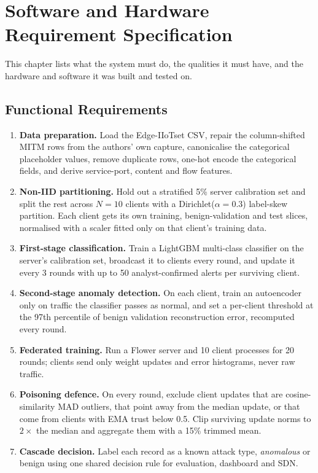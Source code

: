 \chapter{Software and Hardware Requirement Specification}
This chapter lists what the system must do, the qualities it must have, and the hardware and software it was built and tested on.

\section{Functional Requirements}
\begin{enumerate}
  \item[FR1] \textbf{Data preparation.} Load the Edge-IIoTset CSV, repair the column-shifted MITM rows from the authors' own capture, canonicalise the categorical placeholder values, remove duplicate rows, one-hot encode the categorical fields, and derive service-port, content and flow features.
  \item[FR2] \textbf{Non-IID partitioning.} Hold out a stratified 5\% server calibration set and split the rest across $N=10$ clients with a Dirichlet($\alpha=0.3$) label-skew partition. Each client gets its own training, benign-validation and test slices, normalised with a scaler fitted only on that client's training data.
  \item[FR3] \textbf{First-stage classification.} Train a LightGBM multi-class classifier on the server's calibration set, broadcast it to clients every round, and update it every 3 rounds with up to 50 analyst-confirmed alerts per surviving client.
  \item[FR4] \textbf{Second-stage anomaly detection.} On each client, train an autoencoder only on traffic the classifier passes as normal, and set a per-client threshold at the 97th percentile of benign validation reconstruction error, recomputed every round.
  \item[FR5] \textbf{Federated training.} Run a Flower server and 10 client processes for 20 rounds; clients send only weight updates and error histograms, never raw traffic.
  \item[FR6] \textbf{Poisoning defence.} On every round, exclude client updates that are cosine-similarity MAD outliers, that point away from the median update, or that come from clients with EMA trust below 0.5. Clip surviving update norms to $2\times$ the median and aggregate them with a 15\% trimmed mean.
  \item[FR7] \textbf{Cascade decision.} Label each record as a known attack type, \emph{anomalous} or benign using one shared decision rule for evaluation, dashboard and SDN.

\end{enumerate}
